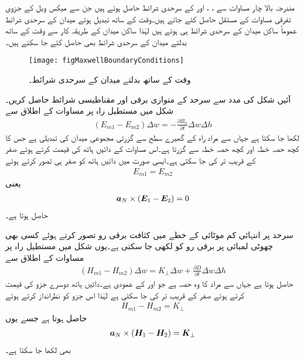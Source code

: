 مندرجہ بالا چار مساوات سے ، ،  اور  کے سرحدی شرائط حاصل ہوتے ہیں جن سے میکس ویل کے جزوی تفرقی مساوات کے مستقل حاصل کئے جاتے ہیں۔وقت کے ساتھ تبدیل ہوتے میدان کے سرحدی شرائط عموماً ساکن میدان کے سرحدی شرائط ہی ہوتے ہیں لہٰذا ساکن میدان کے طریقہ کار سے وقت کے ساتھ بدلتے میدان کے سرحدی شرائط بھی حاصل کئے جا سکتے ہیں۔

\begin{figure}
\centering
\texttt{[image: figMaxwellBoundaryConditions]}
\caption{وقت کے ساتھ بدلتے میدان کے سرحدی شرائط۔}
\label{شکل_میکس_ویل_سرحدی_شرائط}
\end{figure}

آئیں شکل   کی مدد سے  سرحد کے متوازی برقی اور مقناطیسی شرائط حاصل کریں۔ شکل میں مستطیل راہ پر مساوات  کے اطلاق سے
\begin{align*}
\left(E_{m1}-E_{m2}\right) \Delta w=-\frac{\partial B_{n}}{\partial t}  \Delta w \Delta h
\end{align*}  
لکھا جا سکتا ہے جہاں  سے مراد راہ کے گھیرے سطح سے گزرتی مجموعی میدان کی تبدیلی ہے جس کا کچھ حصہ خطہ  اور کچھ حصہ خطہ  سے گزرتا ہے۔اس مساوات کے دائیں ہاتھ کی قیمت  کرتے ہوئے صفر کے قریب تر کی جا سکتی ہے۔ایسی صورت میں دائیں ہاتھ کو صفر ہی تصور کرتے ہوئے
\begin{align}\label{مساوات_میکس_ویل_سرحدی_شرائط_بدلتے_میدان_الف}
E_{m1}=E_{m2}
\end{align}
یعنی
\begin{align}
{\boldsymbol{a}}_N \times \left({{\boldsymbol{E}}}_1-{{\boldsymbol{E}}}_2 \right)=0
\end{align}
حاصل ہوتا ہے۔

سرحد پر انتہائی کم موٹائی کے خطے میں کثافت برقی رو  تصور کرتے ہوئے کسی بھی چھوٹی لمبائی  پر برقی رو کو  لکھی جا سکتی ہے۔یوں شکل  میں مستطیل راہ پر مساوات  کے اطلاق سے
\begin{align*}
\left(H_{m1}-H_{m2} \right) \Delta w=K_\perp \Delta w +\frac{\partial D}{\partial t} \Delta w \Delta h
\end{align*}
حاصل ہوتا ہے جہاں  سے مراد  کا وہ حصہ ہے جو  اور  کے عمودی ہے۔دائیں ہاتھ دوسرے جزو کی قیمت  کرتے ہوئے صفر کے قریب تر کی جا سکتی ہے لہٰذا اس جزو کو نظرانداز کرتے ہوئے
\begin{align}\label{مساوات_میکس_ویل_متوازی_مقناطیسی_موج_سرحدی_شرط}
H_{m1}-H_{m2}=K_\perp
\end{align}
حاصل ہوتا ہے جسے یوں
\begin{align}
{\boldsymbol{a}}_N \times \left({{\boldsymbol{H}}}_1-{{\boldsymbol{H}}}_2 \right)={{\boldsymbol{K}}}_\perp
\end{align}
بھی لکھا جا سکتا ہے۔

